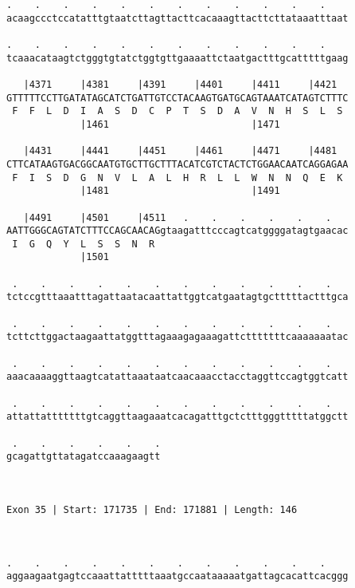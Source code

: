 \documentclass{article}
\begin{document}
\begin{Verbatim}
.    .    .    .    .    .    .    .    .    .    .    .    
acaagccctccatatttgtaatcttagttacttcacaaagttacttcttataaatttaat
                                                            
.    .    .    .    .    .    .    .    .    .    .    .    
tcaaacataagtctgggtgtatctggtgttgaaaattctaatgactttgcatttttgaag
                                                            
   |4371     |4381     |4391     |4401     |4411     |4421  
GTTTTTCCTTGATATAGCATCTGATTGTCCTACAAGTGATGCAGTAAATCATAGTCTTTC
 F  F  L  D  I  A  S  D  C  P  T  S  D  A  V  N  H  S  L  S 
             |1461                         |1471            
  
   |4431     |4441     |4451     |4461     |4471     |4481  
CTTCATAAGTGACGGCAATGTGCTTGCTTTACATCGTCTACTCTGGAACAATCAGGAGAA
 F  I  S  D  G  N  V  L  A  L  H  R  L  L  W  N  N  Q  E  K 
             |1481                         |1491            
  
   |4491     |4501     |4511   .    .    .    .    .    .   
AATTGGGCAGTATCTTTCCAGCAACAGgtaagatttcccagtcatggggatagtgaacac
 I  G  Q  Y  L  S  S  N  R                                  
             |1501                                          
  
 .    .    .    .    .    .    .    .    .    .    .    .   
tctccgtttaaatttagattaatacaattattggtcatgaatagtgctttttactttgca
                                                            
 .    .    .    .    .    .    .    .    .    .    .    .   
tcttcttggactaagaattatggtttagaaagagaaagattctttttttcaaaaaaatac
                                                            
 .    .    .    .    .    .    .    .    .    .    .    .   
aaacaaaaggttaagtcatattaaataatcaacaaacctacctaggttccagtggtcatt
                                                            
 .    .    .    .    .    .    .    .    .    .    .    .   
attattatttttttgtcaggttaagaaatcacagatttgctctttgggtttttatggctt
                                                            
 .    .    .    .    .    .
gcagattgttatagatccaaagaagtt
                           
                           
 
Exon 35 | Start: 171735 | End: 171881 | Length: 146



.    .    .    .    .    .    .    .    .    .    .    .    
aggaagaatgagtccaaattatttttaaatgccaataaaaatgattagcacattcacggg
                                                            

\end{Verbatim}
\end{document}
